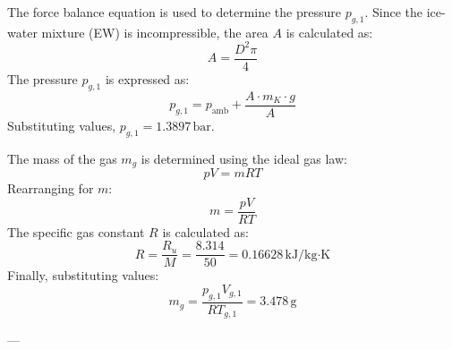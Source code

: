 The force balance equation is used to determine the pressure \( p_{g,1} \). Since the ice-water mixture (EW) is incompressible, the area \( A \) is calculated as:  
\[
A = \frac{D^2 \pi}{4}
\]  
The pressure \( p_{g,1} \) is expressed as:  
\[
p_{g,1} = p_{\text{amb}} + \frac{A \cdot m_K \cdot g}{A}
\]  
Substituting values, \( p_{g,1} = 1.3897 \, \text{bar} \).  

The mass of the gas \( m_g \) is determined using the ideal gas law:  
\[
pV = mRT
\]  
Rearranging for \( m \):  
\[
m = \frac{pV}{RT}
\]  
The specific gas constant \( R \) is calculated as:  
\[
R = \frac{R_u}{M} = \frac{8.314}{50} = 0.16628 \, \text{kJ/kg·K}
\]  
Finally, substituting values:  
\[
m_g = \frac{p_{g,1} V_{g,1}}{R T_{g,1}} = 3.478 \, \text{g}
\]  

---